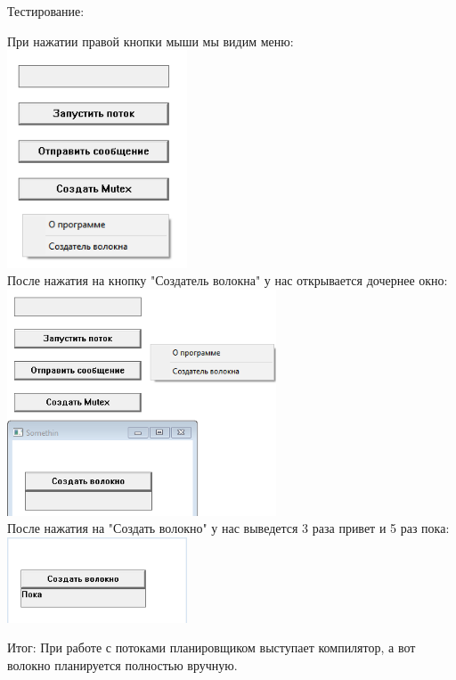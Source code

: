 \documentclass[12pt]{article}
\begin{document}
Тестирование:
\begin{center}
При нажатии правой кнопки мыши мы видим меню:\\

\includegraphics[width=0.4\textwidth]{assets/10.png}\\

После нажатия на кнопку "Создатель волокна" у нас открывается дочернее окно:\\

\includegraphics[width=0.6\textwidth]{assets/11.png}\\

После нажатия на "Создать волокно" у нас выведется 3 раза привет и 5 раз пока:\\

\includegraphics[width=0.4\textwidth]{assets/13.png}\\

\end{center}
Итог: При работе с потоками планировщиком выступает компилятор, а вот волокно планируется полностью вручную.
\end{document}
